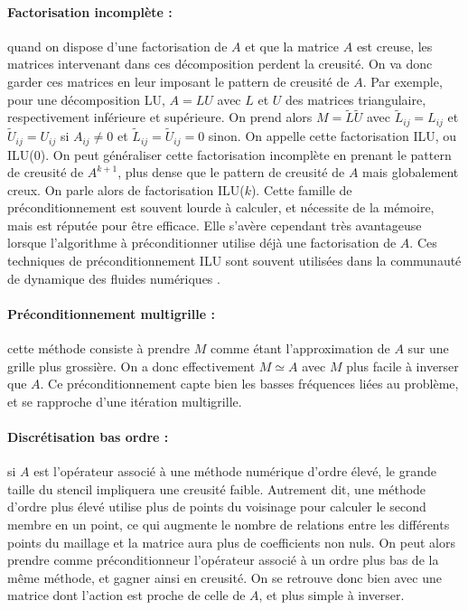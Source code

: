 		\paragraph{Factorisation incomplète :}
		quand on dispose d'une factorisation de $A$ et que la matrice $A$ est creuse, les matrices intervenant dans ces décomposition perdent la creusité.
		On va donc garder ces matrices en leur imposant le pattern de creusité de $A$.
    Par exemple, pour une décomposition LU, $A = LU$ avec $L$ et $U$ des matrices triangulaire, respectivement inférieure et supérieure.
		On prend alors $M=\widetilde{L}\widetilde{U}$ avec $\widetilde{L}_{ij}=L_{ij}$ et $\widetilde{U}_{ij}=U_{ij}$ si $A_{ij}\neq0$ et $\widetilde{L}_{ij}=\widetilde{U}_{ij}=0$ sinon.
    On appelle cette factorisation ILU, ou ILU(0).
		On peut généraliser cette factorisation incomplète en prenant le pattern de creusité de $A^{k+1}$, plus dense que le pattern de creusité de $A$ mais globalement creux.
    On parle alors de factorisation ILU($k$).
		Cette famille de préconditionnement est souvent lourde à calculer, et nécessite de la mémoire, mais est réputée pour être efficace.
		Elle s'avère cependant très avantageuse lorsque l'algorithme à préconditionner utilise déjà une factorisation de $A$.
    Ces techniques de préconditionnement ILU sont souvent utilisées dans la communauté de dynamique des fluides numériques \cite{LiuZhangZhongEtAl2015, AhrabiMavriplis2020}.

		\paragraph{Préconditionnement multigrille :}
		cette méthode consiste à prendre $M$ comme étant l'approximation de $A$ sur une grille plus grossière.
		On a donc effectivement $M\simeq A$ avec $M$ plus facile à inverser que $A$.
		Ce préconditionnement capte bien les basses fréquences liées au problème, et se rapproche d'une itération multigrille.

		\paragraph{Discrétisation bas ordre :}
		si $A$ est l'opérateur associé à une méthode numérique d'ordre élevé, le grande taille du stencil impliquera une creusité faible.
		Autrement dit, une méthode d'ordre plus élevé utilise plus de points du voisinage pour calculer le second membre en un point, ce qui augmente le nombre de relations entre les différents points du maillage et la matrice aura plus de coefficients non nuls.
		On peut alors prendre comme préconditionneur l'opérateur associé à un ordre plus bas de la même méthode, et gagner ainsi en creusité.
		On se retrouve donc bien avec une matrice dont l'action est proche de celle de $A$, et plus simple à inverser.

